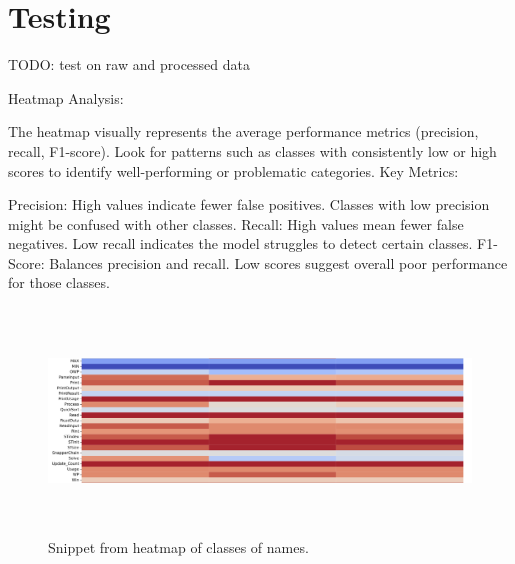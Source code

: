 \documentclass[10pt,english,a4paper]{report}
\begin{document}
\chapter{Testing}
\label{item:chapter_testing}
TODO: test on raw and processed data

Heatmap Analysis:

The heatmap visually represents the average performance metrics (precision, recall, F1-score).
Look for patterns such as classes with consistently low or high scores to identify well-performing or problematic categories.
Key Metrics:

Precision: High values indicate fewer false positives. Classes with low precision might be confused with other classes.
Recall: High values mean fewer false negatives. Low recall indicates the model struggles to detect certain classes.
F1-Score: Balances precision and recall. Low scores suggest overall poor performance for those classes.


\begin{figure}[h!]
    \centering
    \includegraphics[width=16cm, height=6cm]{figures/heatmap_snippet.png} 
    \caption{Snippet from heatmap of classes of names.}
    \label{fig:func_lengths_distr_merged}
\end{figure}



\end{document}
